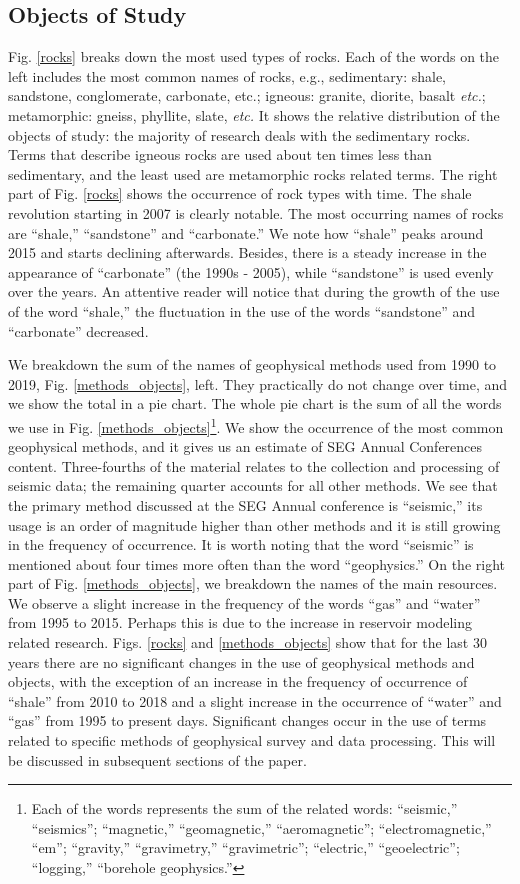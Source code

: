 \documentclass[geosciences,article,submit,moreauthors,pdftex]{Definitions/mdpi}
\begin{document}
\subsection{Objects of  Study}
Fig. \ref{rocks} breaks down the most used types of rocks. Each of the words on the left includes the most common names of rocks, e.g., sedimentary: shale, sandstone, conglomerate, carbonate, etc.; igneous: granite, diorite, basalt \textit{etc.}; metamorphic: gneiss, phyllite, slate, \textit{etc.} It shows the relative distribution of the objects of study: the majority of research deals with the sedimentary rocks. Terms that describe igneous rocks are used about ten times less than sedimentary, and the least used are metamorphic rocks related terms. The right part of Fig. \ref{rocks} shows the occurrence of rock types with time. The shale revolution starting in 2007 is clearly notable. The most occurring names of rocks are ``shale,'' ``sandstone'' and ``carbonate.'' We note how ``shale'' peaks around 2015 and starts declining afterwards. Besides, there is a steady increase in the appearance of ``carbonate'' (the 1990s - 2005), while ``sandstone'' is used evenly over the years. An attentive reader will notice that during the growth of the use of the word ``shale,'' the fluctuation in the use of the words ``sandstone'' and ``carbonate'' decreased.


We breakdown the sum of the names of geophysical methods used from 1990 to 2019, Fig. \ref{methods_objects}, left. They practically do not change over time, and we show the total in a pie chart. The whole pie chart is the sum of all the words we use in Fig. \ref{methods_objects}\footnote{Each of the words represents the sum of the related words: ``seismic,'' ``seismics''; ``magnetic,'' ``geomagnetic,'' ``aeromagnetic''; ``electromagnetic,'' ``em''; ``gravity,'' ``gravimetry,'' ``gravimetric''; ``electric,'' ``geoelectric''; ``logging,'' ``borehole geophysics.''}. We show the occurrence of the most common geophysical methods, and it gives us an estimate of SEG Annual Conferences content. Three-fourths of the material relates to the collection and processing of seismic data; the remaining quarter accounts for all other methods. We see that the primary method discussed at the SEG Annual conference is ``seismic,'' its usage is an order of magnitude higher than other methods and it is still growing in the frequency of occurrence. It is worth noting that the word ``seismic'' is mentioned about four times more often than the word ``geophysics.'' On the right part of Fig. \ref{methods_objects}, we breakdown the names of the main resources. We observe a slight increase in the frequency of the words ``gas'' and ``water'' from 1995 to 2015. Perhaps this is due to the increase in reservoir modeling related research. 
Figs. \ref{rocks} and \ref{methods_objects} show that for the last 30 years there are no significant changes in the use of geophysical methods and objects, with the exception of an increase in the frequency of occurrence of ``shale'' from 2010 to 2018 and a slight increase in the occurrence of ``water'' and ``gas'' from 1995 to present days.
Significant changes occur in the use of terms related to specific methods of geophysical survey and data processing. This will be discussed in subsequent sections of the paper.
\end{document}
